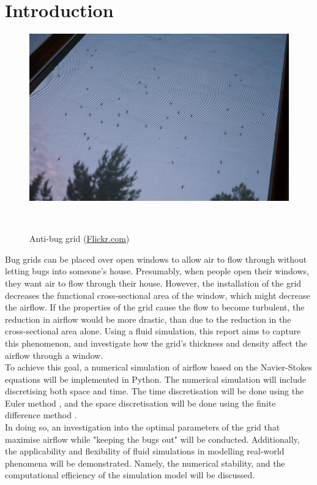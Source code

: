 \section{Introduction} \label{section: intro and motiv}

\begin{figure}
\vspace{-1.5cm}
\includegraphics[width=0.9\linewidth]{figures/mosquitogrid.jpg}
\caption{Anti-bug grid (\href{https://www.flickr.com/photos/neekohfi/7817306994/}{Flickr.com})}\
\end{figure}

Bug grids can be placed over open windows to allow air to flow through without letting bugs into someone's house. Presumably, when people open their windows, they want air to flow through their house. However, the installation of the grid decreases the functional cross-sectional area of the window, which might decrease the airflow. If the properties of the grid cause the flow to become turbulent, the reduction in airflow would be more drastic, than due to the reduction in the cross-sectional area alone. Using a fluid simulation, this report aims to capture this phenomenon, and investigate how the grid's thickness and density affect the airflow through a window. \\

To achieve this goal, a numerical simulation of airflow based on the Navier-Stokes equations will be implemented in Python. The numerical simulation will include discretising both space and time. The time discretisation will be done using the Euler method
, and the space discretisation will be done using the finite difference method \cite{landau2015computational}. \\ 

In doing so, an investigation into the optimal parameters of the grid that maximise airflow while "keeping the bugs out" will be conducted. Additionally, the applicability and flexibility of fluid simulations in modelling real-world phenomena will be demonstrated. Namely, the numerical stability, and the computational efficiency of the simulation model will be discussed. \\


